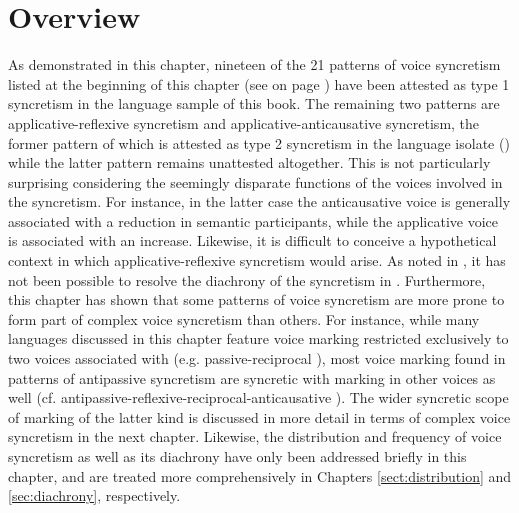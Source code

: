 \section{Overview} \label{sec:simple-syncretism:overview}
As demonstrated in this chapter, nineteen of the 21 patterns of voice syncretism listed at the beginning of this chapter (see  on page \pageref{tab:ch4:simplex-patterns}) have been attested as type 1 syncretism in the language sample of this book. The remaining two patterns are applicative-reflexive syncretism and applicative-anticausative syncretism, the former pattern of which is attested as type 2 syncretism in the language isolate  () while the latter pattern remains unattested altogether. This is not particularly surprising considering the seemingly disparate functions of the voices involved in the syncretism. For instance, in the latter case the anticausative voice is generally associated with a reduction in semantic participants, while the applicative voice is associated with an increase. Likewise, it is difficult to conceive a hypothetical context in which applicative-reflexive syncretism would arise. As noted in , it has not been possible to resolve the diachrony of the syncretism in . Furthermore, this chapter has shown that some patterns of voice syncretism are more prone to form part of complex voice syncretism than others. For instance, while many languages discussed in this chapter feature voice marking restricted exclusively to two voices associated with  (e.g.  passive-reciprocal ), most voice marking found in patterns of antipassive syncretism are syncretic with marking in other voices as well (cf.  antipassive-reflexive-reciprocal-anticausative ). The wider syncretic scope of marking of the latter kind is discussed in more detail in terms of complex voice syncretism in the next chapter. Likewise, the distribution and frequency of voice syncretism as well as its diachrony have only been addressed briefly in this chapter, and are treated more comprehensively in Chapters \ref{sect:distribution} and \ref{sec:diachrony}, respectively.

